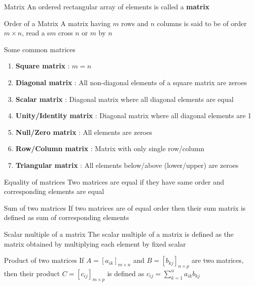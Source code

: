 \documentclass[titlepage, 12pt]{book}
\begin{document}
\begin{definition}{Matrix}{}
    An ordered rectangular array of elements is called a \textbf{matrix}
\end{definition}

\begin{definition}{Order of a Matrix}{}
    A matrix having $m$ rows and $n$ columns is said to be of order $m\times n$,
    read a s$m$ cross $n$ or $m$ by $n$
\end{definition}

Some common matrices
\begin{enumerate}
    \item\textbf{Square matrix} : $m = n$
    \item\textbf{Diagonal matrix} : All non-diagonal elements of a square matrix
        are zeroes
    \item\textbf{Scalar matrix} : Diagonal matrix where all diagonal elements
        are equal
    \item\textbf{Unity/Identity matrix} : Diagonal matrix where all diagonal
        elements are 1
    \item\textbf{Null/Zero matrix} : All elements are zeroes
    \item\textbf{Row/Column matrix} : Matrix with only single row/column
    \item\textbf{Triangular matrix} : All elements below/above (lower/upper) are
        zeroes
\end{enumerate}

\begin{definition}{Equality of matrices}{}
    Two matrices are equal if they have same order and corresponding elements
    are equal
\end{definition}

\begin{definition}{Sum of two matrices}{}
    If two matrices are of equal order then their sum matrix is defined as sum
    of corresponding elements
\end{definition}

\begin{definition}{Scalar multiple of a matrix}{}
    The scalar multiple of a matrix is defined as the matrix obtained by
    multiplying each element by fixed scalar
\end{definition}

\begin{definition}{Product of two matrices}{}
    If $A = [a_{ik}]_{m\times n}$ and $B = [b_{kj}]_{n\times p}$ are two
    matrices, then their product $C = [c_{ij}]_{m\times p}$ is defined as
    $c_{ij} = \sum_{k = 1}^n a_{ik}b_{kj}$
\end{definition}
\end{document}
